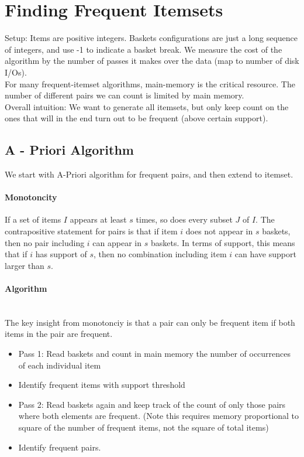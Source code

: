 \section{Finding Frequent Itemsets} 
Setup: Items are positive integers. Baskets configurations are just a long sequence of integers, and use -1 to indicate a basket break. We measure the cost of the algorithm by the number of passes it makes over the data (map to number of disk I/Os). \\

For many frequent-itemset algorithms, main-memory is the critical resource. The number of different pairs we can count is limited by main memory. \\

Overall intuition: We want to generate all itemsets, but only keep count on the ones that will in the end turn out to be frequent (above certain support). 

\subsection{A - Priori Algorithm} 
We start with A-Priori algorithm for frequent pairs, and then extend to itemset. 

\paragraph{Monotoncity} 
If a set of items $I$ appears at least $s$ times, so does every subset $J$ of $I$. The contrapositive statement for pairs is that if item $i$ does not appear in $s$ baskets, then no pair including $i$ can appear in $s$ baskets. In terms of support, this means that if $i$ has support of $s$, then no combination including item $i$ can have support larger than $s$. 

\paragraph{Algorithm} \mbox{}\\
The key insight from monotonciy is that a pair can only be frequent item if both items in the pair are frequent. 
    \begin{itemize}
        \item Pass 1: Read baskets and count in main memory the number of occurrences of each individual item 
        \item Identify frequent items with support threshold
        \item Pass 2: Read baskets again and keep track of the count of only those pairs where both elements are frequent. (Note this requires memory proportional to square of the number of frequent items, not the square of total items)
        \item Identify frequent pairs. 
    \end{itemize}
    
